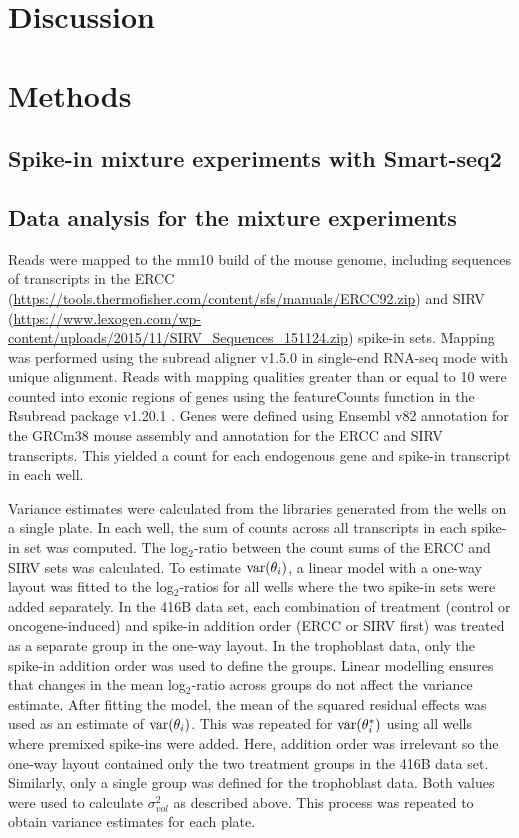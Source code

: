 \documentclass{article}
\begin{document}
\section{Discussion}

\section{Methods}

\subsection{Spike-in mixture experiments with Smart-seq2}

\subsection{Data analysis for the mixture experiments}
Reads were mapped to the mm10 build of the mouse genome, including sequences of transcripts in the ERCC (\url{https://tools.thermofisher.com/content/sfs/manuals/ERCC92.zip}) and SIRV (\url{https://www.lexogen.com/wp-content/uploads/2015/11/SIRV_Sequences_151124.zip}) spike-in sets.
Mapping was performed using the subread aligner v1.5.0 \cite{liao2013subread} in single-end RNA-seq mode with unique alignment.
Reads with mapping qualities greater than or equal to 10 were counted into exonic regions of genes using the featureCounts function in the Rsubread package v1.20.1 \cite{liao2014featurecounts}.
Genes were defined using Ensembl v82 annotation for the GRCm38 mouse assembly and annotation for the ERCC and SIRV transcripts.
This yielded a count for each endogenous gene and spike-in transcript in each well.

Variance estimates were calculated from the libraries generated from the wells on a single plate.
In each well, the sum of counts across all transcripts in each spike-in set was computed.
The log$_2$-ratio between the count sums of the ERCC and SIRV sets was calculated.
To estimate $\mbox{var}(\theta_i)$, a linear model with a one-way layout was fitted to the log$_2$-ratios for all wells where the two spike-in sets were added separately.
In the 416B data set, each combination of treatment (control or oncogene-induced) and spike-in addition order (ERCC or SIRV first) was treated as a separate group in the one-way layout.
In the trophoblast data, only the spike-in addition order was used to define the groups.
Linear modelling ensures that changes in the mean log$_2$-ratio across groups do not affect the variance estimate.
After fitting the model, the mean of the squared residual effects was used as an estimate of $\mbox{var}(\theta_i)$.
This was repeated for $\mbox{var}(\theta^*_i)$ using all wells where premixed spike-ins were added.
Here, addition order was irrelevant so the one-way layout contained only the two treatment groups in the 416B data set.
Similarly, only a single group was defined for the trophoblast data.
Both values were used to calculate $\sigma^2_{vol}$ as described above.
This process was repeated to obtain variance estimates for each plate.
\end{document}
